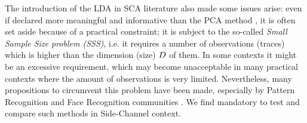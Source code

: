 The introduction of the LDA in SCA literature also made some issues arise: even if declared more meaningful and informative than the PCA method \cite{Standaert2008}, it is often set aside because of a practical constraint; it is subject to the so-called {\em Small Sample Size problem (SSS)}, i.e. it requires a number of observations (traces) which is higher than the dimension (size) $D$ of them. In some contexts it might be an excessive requirement, which may become unacceptable in many practical contexts where the amount of observations is very limited. Nevertheless, many propositions to circumvent this problem have been made, especially by Pattern Recognition and Face Recognition communities \cite{eigenfaces,Chen2000,huang,Yu01adirect}. We find mandatory to test and compare such methods in Side-Channel context.